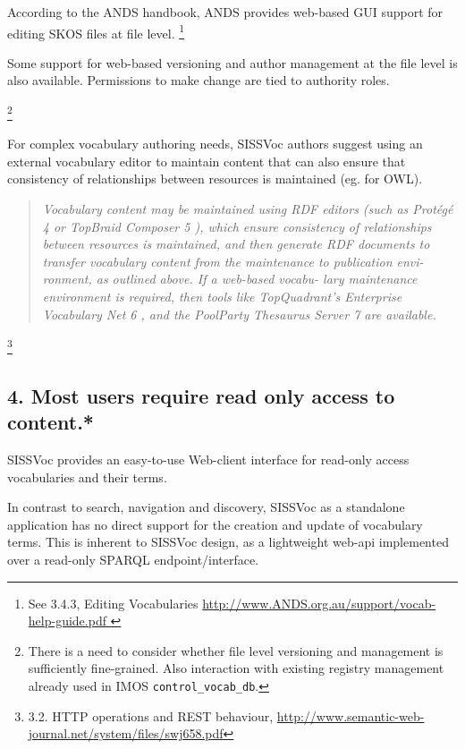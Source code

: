 \documentclass[10pt,a4paper]{article}
\newenvironment{italicquotes}
{\begin{quote}\itshape}
{\end{quote}}
\begin{document}
\begin{flushleft}
%    
  According to the ANDS handbook, ANDS provides web-based GUI support for editing SKOS files at file level. 
  \footnote { See 3.4.3, Editing Vocabularies \url{ http://www.ANDS.org.au/support/vocab-help-guide.pdf } 
  }

  Some support for web-based versioning and author management at the file level
is also available. Permissions to make change are tied to authority roles.

  \footnote {
    There is a need to consider whether file level versioning and management is
  sufficiently fine-grained. Also interaction with existing registry management
  already used in IMOS \texttt{control\_vocab\_db}. 
  }
  
  For complex vocabulary authoring needs, SISSVoc authors suggest using an
external vocabulary editor to maintain content that can also ensure that consistency of
relationships between resources is maintained (eg. for OWL). 

  \begin{italicquotes} 
  Vocabulary content may be maintained using RDF editors (such as Protégé 4 or
TopBraid Composer 5 ), which ensure consistency of
relationships between resources is maintained, and
then generate RDF documents to transfer vocabulary
content from the maintenance to publication envi-
ronment, as outlined above. If a web-based vocabu-
lary maintenance environment is required, then tools
like TopQuadrant’s Enterprise Vocabulary Net 6 , and
the PoolParty Thesaurus Server 7 are available.
  \end{italicquotes} 

  \footnote {
    3.2. HTTP operations and REST behaviour, 
\url{http://www.semantic-web-journal.net/system/files/swj658.pdf} 
  }


\subsection{ 
  4. Most users require read only access to content.* 
}
  SISSVoc provides an easy-to-use Web-client interface for read-only access vocabularies and their terms.

  In contrast to search, navigation and discovery, SISSVoc as a standalone application has no direct 
  support for the creation and update of vocabulary terms. This is inherent to SISSVoc design, as a 
  lightweight web-api implemented over a read-only SPARQL endpoint/interface.  


\end{flushleft}
\end{document}
